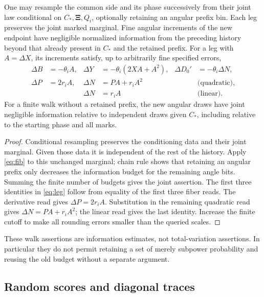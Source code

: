 \begin{corollary}\label{names:walks}
One may resample the common side and its phase successively
from their joint law conditional on
\(C_*,\boldsymbol\Xi,Q_i\), optionally retaining an angular
prefix bin. Each leg preserves the joint marked marginal.
Fine angular increments of the new endpoint have negligible
normalized information from the preceding history beyond
that already present in \(C_*\) and the retained prefix.
For a leg with \(A=\Delta X\), its increments satisfy, up
to arbitrarily fine specified errors,
\begin{equation}
\begin{aligned}
 \Delta B&=-\theta_i A,&
 \Delta Y&=-\theta_i(2XA+A^2),&
 \Delta D_0'&=-\theta_i\Delta N,\\
 \Delta P&=2r_iA,&
 \Delta N&=PA+r_iA^2&&\text{(quadratic)},\\
 &&\Delta N&=r_iA&&\text{(linear)}.
\end{aligned}
\tag{leg}\label{eq:leg}
\end{equation}
For a finite walk without a retained prefix, the new angular
draws have joint negligible information relative to independent
draws given \(C_*\), including relative to the starting
phase and all marks.
\end{corollary}

\begin{proof}
Conditional resampling preserves the conditioning data and
their joint marginal. Given those data it is independent of
the rest of the history. Apply \eqref{eq:fib} to this
unchanged marginal; chain rule shows that retaining an
angular prefix only decreases the information budget for
the remaining angle bits. Summing the finite number of
budgets gives the joint assertion. The first three
identities in \eqref{eq:leg} follow from equality of the
first three fiber reads. The derivative read gives
\(\Delta P=2r_iA\). Substitution in the remaining quadratic
read gives \(\Delta N=PA+r_iA^2\); the linear read gives
the last identity. Increase the finite cutoff to make all
rounding errors smaller than the queried scales.
\end{proof}

These walk assertions are information estimates, not
total-variation assertions. In particular they do not permit
retaining a set of merely subpower probability and reusing
the old budget without a separate argument.

\subsection{Random scores and diagonal traces}
\label{names:score-calculus}

